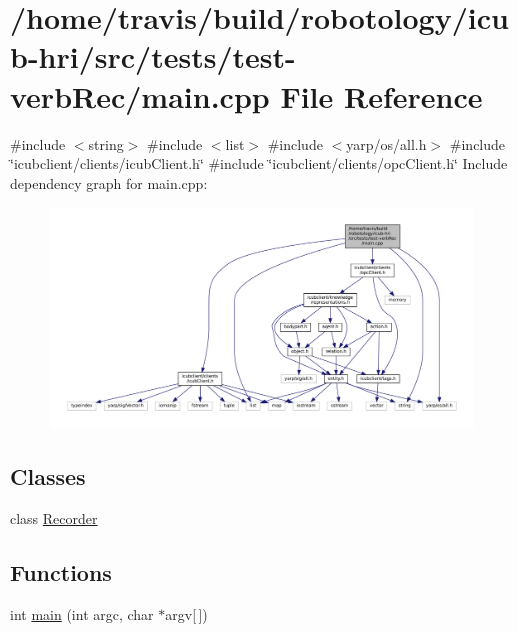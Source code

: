 \hypertarget{tests_2test-verbRec_2main_8cpp}{}\section{/home/travis/build/robotology/icub-\/hri/src/tests/test-\/verb\+Rec/main.cpp File Reference}
\label{tests_2test-verbRec_2main_8cpp}
{\ttfamily \#include $<$string$>$}\newline
{\ttfamily \#include $<$list$>$}\newline
{\ttfamily \#include $<$yarp/os/all.\+h$>$}\newline
{\ttfamily \#include \char`\"{}icubclient/clients/icub\+Client.\+h\char`\"{}}\newline
{\ttfamily \#include \char`\"{}icubclient/clients/opc\+Client.\+h\char`\"{}}\newline
Include dependency graph for main.\+cpp\+:
\nopagebreak
\begin{figure}[H]
\begin{center}
\leavevmode
\includegraphics[width=350pt]{tests_2test-verbRec_2main_8cpp__incl}
\end{center}
\end{figure}
\subsection*{Classes}
\begin{DoxyCompactItemize}
\item 
class \hyperlink{classRecorder}{Recorder}
\end{DoxyCompactItemize}
\subsection*{Functions}
\begin{DoxyCompactItemize}
\item 
int \hyperlink{tests_2test-verbRec_2main_8cpp_a0ddf1224851353fc92bfbff6f499fa97}{main} (int argc, char $\ast$argv\mbox{[}$\,$\mbox{]})
\end{DoxyCompactItemize}



